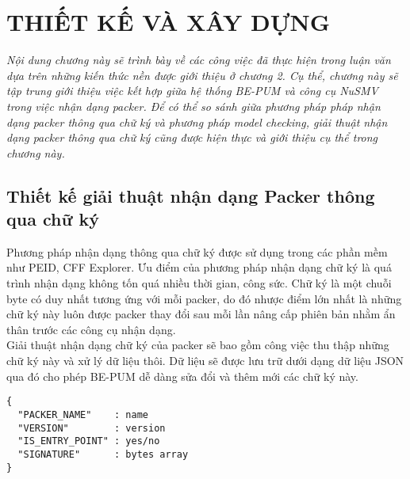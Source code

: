
\newpage
\chapter{THIẾT KẾ VÀ XÂY DỰNG}

\begin{concept}[15cm]
\textit{Nội dung chương này sẽ trình bày về các công việc đã thực hiện trong luận văn dựa trên những kiến thức nền được giới thiệu ở chương 2. Cụ thể, chương này sẽ tập trung giới thiệu việc kết hợp giữa hệ thống BE-PUM và công cụ NuSMV trong việc nhận dạng packer. Để có thể so sánh giữa phương pháp pháp nhận dạng packer thông qua chữ ký và phương pháp model checking, giải thuật nhận dạng packer thông qua chữ ký cũng được hiện thực và giới thiệu cụ thể trong chương này.}
\end{concept}

\section{Thiết kế giải thuật nhận dạng Packer thông qua chữ ký}

\hspace{0.5cm}Phương pháp nhận dạng thông qua chữ ký được sử dụng trong các phần mềm như PEID, CFF Explorer. Ưu điểm của phương pháp nhận dạng chữ ký là quá trình nhận dạng không tốn quá nhiều thời gian, công sức. Chữ ký là một chuỗi byte có duy nhất tương ứng với mỗi packer, do đó nhược điểm lớn nhất là những chữ ký này luôn được packer thay đổi sau mỗi lần nâng cấp phiên bản nhằm ẩn thân trước các công cụ nhận dạng.\\

\hspace{0.5cm}Giải thuật nhận dạng chữ ký của packer sẽ bao gồm công việc thu thập những chữ ký này và xử lý dữ liệu thôi. Dữ liệu sẽ được lưu trữ dưới dạng dữ liệu JSON qua đó cho phép BE-PUM dễ dàng sửa đổi và thêm mới các chữ ký này.

\begin{code}
\begin{lstlisting}[captionpos=b,caption={Cấu trúc lưu trữ của một chữ ký},frame=single]
{
  "PACKER_NAME"    : name
  "VERSION"        : version
  "IS_ENTRY_POINT" : yes/no
  "SIGNATURE"      : bytes array
}
\end{lstlisting}
\end{code}

